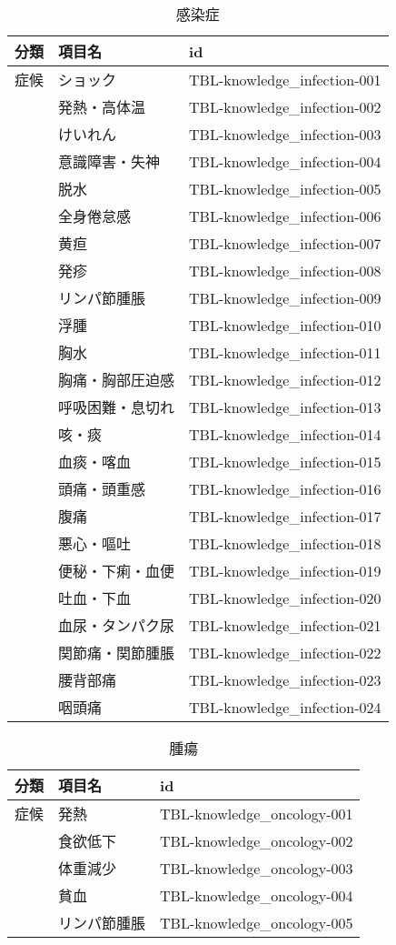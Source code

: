 \begin{xltabular}{\linewidth}{XXX}
\caption{\label{tbl:knowledge_infection}感染症} \\
\toprule
分類 & 項目名 & id \\
\midrule
\endhead
症候 & ショック & TBL-knowledge_infection-001 \\
 & 発熱・高体温 & TBL-knowledge_infection-002 \\
 & けいれん & TBL-knowledge_infection-003 \\
 & 意識障害・失神 & TBL-knowledge_infection-004 \\
 & 脱水 & TBL-knowledge_infection-005 \\
 & 全身倦怠感 & TBL-knowledge_infection-006 \\
 & 黄疸 & TBL-knowledge_infection-007 \\
 & 発疹 & TBL-knowledge_infection-008 \\
 & リンパ節腫脹 & TBL-knowledge_infection-009 \\
 & 浮腫 & TBL-knowledge_infection-010 \\
 & 胸水 & TBL-knowledge_infection-011 \\
 & 胸痛・胸部圧迫感 & TBL-knowledge_infection-012 \\
 & 呼吸困難・息切れ & TBL-knowledge_infection-013 \\
 & 咳・痰 & TBL-knowledge_infection-014 \\
 & 血痰・喀血 & TBL-knowledge_infection-015 \\
 & 頭痛・頭重感 & TBL-knowledge_infection-016 \\
 & 腹痛 & TBL-knowledge_infection-017 \\
 & 悪心・嘔吐 & TBL-knowledge_infection-018 \\
 & 便秘・下痢・血便 & TBL-knowledge_infection-019 \\
 & 吐血・下血 & TBL-knowledge_infection-020 \\
 & 血尿・タンパク尿 & TBL-knowledge_infection-021 \\
 & 関節痛・関節腫脹 & TBL-knowledge_infection-022 \\
 & 腰背部痛 & TBL-knowledge_infection-023 \\
 & 咽頭痛 & TBL-knowledge_infection-024 \\
\bottomrule
\end{xltabular}

\begin{xltabular}{\linewidth}{XXX}
\caption{\label{tbl:knowledge_oncology}腫瘍} \\
\toprule
分類 & 項目名 & id \\
\midrule
\endhead
症候 & 発熱 & TBL-knowledge_oncology-001 \\
 & 食欲低下 & TBL-knowledge_oncology-002 \\
 & 体重減少 & TBL-knowledge_oncology-003 \\
 & 貧血 & TBL-knowledge_oncology-004 \\
 & リンパ節腫脹 & TBL-knowledge_oncology-005 \\
\bottomrule
\end{xltabular}
